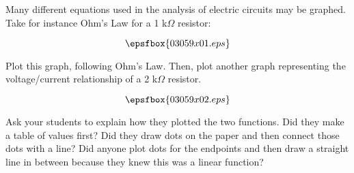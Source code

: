 

Many different equations used in the analysis of electric circuits may be graphed.  Take for instance Ohm's Law for a 1 k$\Omega$ resistor:

$$\epsfbox{03059x01.eps}$$

Plot this graph, following Ohm's Law.  Then, plot another graph representing the voltage/current relationship of a 2 k$\Omega$ resistor.







$$\epsfbox{03059x02.eps}$$







Ask your students to explain how they plotted the two functions.  Did they make a table of values first?  Did they draw dots on the paper and then connect those dots with a line?  Did anyone plot dots for the endpoints and then draw a straight line in between because they knew this was a linear function?




